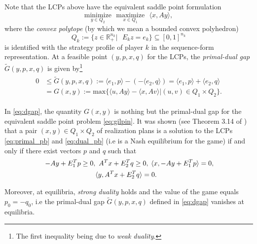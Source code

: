 \documentclass[a4paper,9pt]{extarticle}
\begin{document}
Note that the LCPs above have the equivalent saddle point formulation
\begin{equation}
  \underset{y \in Q_2}{\text{minimize}}\text{ }\underset{x \in
    Q_1}{\text{maximize}}\text{ }\langle x, Ay\rangle,
  \label{eq:gilpin}
\end{equation}
where the \textit{convex polytope} (by which we mean a bounded convex
polyhedron)
\begin{equation}
  Q_k := \{z \in \mathbb{R}^{n_k}_+ |\text{ }E_kz = e_k\} \subseteq
  [0, 1]^{n_k}
\label{eq:polytope}
\end{equation}
is identified with the strategy profile of player $k$ in the
sequence-form representation. At a feasible point $(y, p, x, q)$ for
the LCPs, the \textit{primal-dual gap} $\tilde{G}(y, p, x, q)$ is
given by\footnote{The first inequality being due to \textit{weak
    duality}.}
\begin{eqnarray}
  \begin{split}
  0 &\le \tilde{G}(y, p, x, q) := \langle e_1, p\rangle - (-\langle
  e_2, q\rangle) = \langle e_1, p\rangle + \langle
  e_2, q\rangle\\
  &= G(x, y) := \mathrm{max}\{\langle u, Ay\rangle - \langle x, Av\rangle |
(u,v) \in Q_1 \times Q_2\}.
\end{split}
  \label{eq:dgap}
\end{eqnarray}

In \eqref{eq:dgap}, the quantity $G(x, y)$ is nothing but the primal-dual
gap for the equivalent saddle point problem \eqref{eq:gilpin}.
It was shown (see Theorem 3.14 of \cite{vonequilibrium}) that a pair
$(x, y) \in Q_1 \times Q_2$ of realization plans is a solution to the
LCPs \eqref{eq:primal_pb} and \eqref{eq:dual_pb} (i.e is a Nash
equilibrium for the game)  if and only if there exist vectors $p$ and
$q$ such that
\begin{equation}
\begin{split}
\hspace{.25em} -Ay + E_1^Tp \ge 0, &\hspace{.5em}A^Tx + E_2^Tq \ge
0, \hspace{.25em} \langle x, -Ay + E_1^Tp\rangle = 0,\\
&\langle y, A^Tx  + E_2^Tq\rangle = 0.
\end{split}
\label{eq:feasibility}
\end{equation}

Moreover, at equilibria, \textit{strong duality} holds and the value
of the game equals $p_0 = -q_0$, i.e the primal-dual gap
$\tilde{G}(y, p, x, q)$ defined in \eqref{eq:dgap} vanishes at
equilibria.
\end{document}
